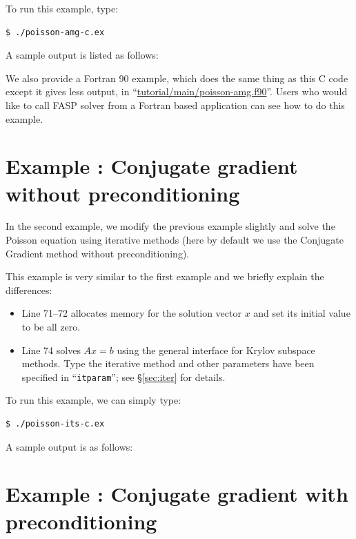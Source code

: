 \documentclass[11pt]{memoir}
\begin{document}
%
To run this example, type:
%
\begin{lstlisting}[numbers=none]
$ ./poisson-amg-c.ex
\end{lstlisting}
%
A sample output is listed as follows:
%


We also provide a Fortran 90 example, which does the same thing as
this C code except it gives less output, in
``\url{tutorial/main/poisson-amg.f90}''. Users who would like to call
FASP solver from a Fortran based application can see how to do this example.
%

%

\section{Example : Conjugate gradient without preconditioning}\label{sec:ex2}
\addtocounter{ex}{1}
In the second example, we modify the previous example slightly and
solve the Poisson equation using iterative methods (here by default we
use the Conjugate Gradient method without preconditioning).
%

%
This example is very similar to the first example and we briefly explain the differences:
\begin{itemize}
%
\item Line 71--72 allocates memory for the solution vector $x$ and set its initial value to be all zero.
%
\item Line 74 solves $Ax=b$ using the general interface for Krylov subspace methods. Type the iterative method and other parameters have been specified in ``\verb|itparam|''; see \S\ref{sec:iter} for details.
%
\end{itemize}
%
To run this example, we can simply type:
%
\begin{lstlisting}[numbers=none,language=sh]
$ ./poisson-its-c.ex
\end{lstlisting}
%
A sample output is as follows:


\section{Example : Conjugate gradient with preconditioning}\label{sec:ex3}
\addtocounter{ex}{1}
\end{document}
